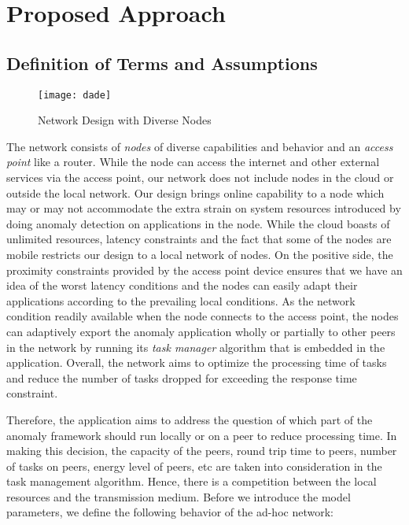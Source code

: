 \section{Proposed Approach}
\label{sec:model}
\subsection{Definition of Terms and Assumptions}
\label{subsec:system}
\begin{figure}[!t]
	\centering
	\texttt{[image: dade]} 
	\caption{Network Design with Diverse Nodes}
	\label{fig:system-architecture}
\end{figure}
The network consists of \emph{nodes} of diverse 
capabilities and behavior and an \emph{access point} like a 
router. While the node can access the internet and 
other external services via the access point, our 
network does not include nodes in the cloud or outside the 
local network. Our design brings online capability to a node  
which may or may not accommodate the extra strain on 
system resources introduced by doing anomaly detection on 
applications in the node. While the
cloud boasts of unlimited resources, latency constraints and 
the fact that some of the nodes are mobile restricts our 
design to a local network of nodes. On the positive 
side, the proximity constraints provided by the access point 
device ensures that we have an idea of the worst latency 
conditions and the nodes can easily adapt their 
applications according to the prevailing local conditions. As 
the 
network condition readily available when the node  
connects to the access point, the nodes can adaptively 
export the anomaly application wholly or partially to other 
peers in the network by running its \emph{task manager} 
algorithm that is embedded in the application. Overall, the  
network aims to optimize the processing time of tasks 
and reduce the number of tasks dropped for exceeding the 
response time constraint. \par
Therefore, the application aims to address the question of 
which part of the anomaly framework should run locally or on 
a peer to reduce processing time. In making this decision, 
the capacity of the peers, round trip time to peers, number 
of tasks on peers, energy level of peers, etc are taken into 
consideration in the task management algorithm. Hence, there 
is a competition between the local resources and the 
transmission medium. Before we introduce the model 
parameters, we define 
the following behavior of the ad-hoc network:
